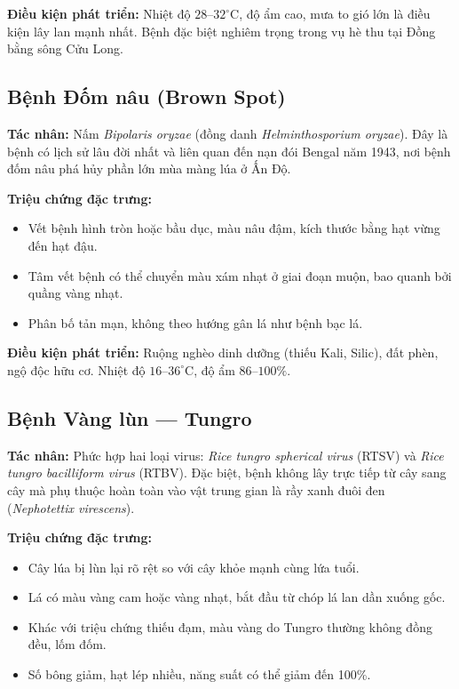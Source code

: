 \documentclass[13pt,a4paper]{extreport}
\begin{document}
\textbf{Điều kiện phát triển:} Nhiệt độ $28$--$32^\circ$C, độ ẩm cao, mưa to gió lớn là điều kiện lây lan mạnh nhất. Bệnh đặc biệt nghiêm trọng trong vụ hè thu tại Đồng bằng sông Cửu Long.

\subsection{Bệnh Đốm nâu (Brown Spot)}
\textbf{Tác nhân:} Nấm \textit{Bipolaris oryzae} (đồng danh \textit{Helminthosporium oryzae}). Đây là bệnh có lịch sử lâu đời nhất và liên quan đến nạn đói Bengal năm 1943, nơi bệnh đốm nâu phá hủy phần lớn mùa màng lúa ở Ấn Độ.

\textbf{Triệu chứng đặc trưng:}
\begin{itemize}[leftmargin=1.5cm]
    \item Vết bệnh hình tròn hoặc bầu dục, màu nâu đậm, kích thước bằng hạt vừng đến hạt đậu.
    \item Tâm vết bệnh có thể chuyển màu xám nhạt ở giai đoạn muộn, bao quanh bởi quầng vàng nhạt.
    \item Phân bố tản mạn, không theo hướng gân lá như bệnh bạc lá.
\end{itemize}

\textbf{Điều kiện phát triển:} Ruộng nghèo dinh dưỡng (thiếu Kali, Silic), đất phèn, ngộ độc hữu cơ. Nhiệt độ $16$--$36^\circ$C, độ ẩm $86$--$100\%$.

\subsection{Bệnh Vàng lùn --- Tungro}
\textbf{Tác nhân:} Phức hợp hai loại virus: \textit{Rice tungro spherical virus} (RTSV) và \textit{Rice tungro bacilliform virus} (RTBV). Đặc biệt, bệnh không lây trực tiếp từ cây sang cây mà phụ thuộc hoàn toàn vào vật trung gian là rầy xanh đuôi đen (\textit{Nephotettix virescens}).

\textbf{Triệu chứng đặc trưng:}
\begin{itemize}[leftmargin=1.5cm]
    \item Cây lúa bị lùn lại rõ rệt so với cây khỏe mạnh cùng lứa tuổi.
    \item Lá có màu vàng cam hoặc vàng nhạt, bắt đầu từ chóp lá lan dần xuống gốc.
    \item Khác với triệu chứng thiếu đạm, màu vàng do Tungro thường không đồng đều, lốm đốm.
    \item Số bông giảm, hạt lép nhiều, năng suất có thể giảm đến 100\%.
\end{itemize}
\end{document}
